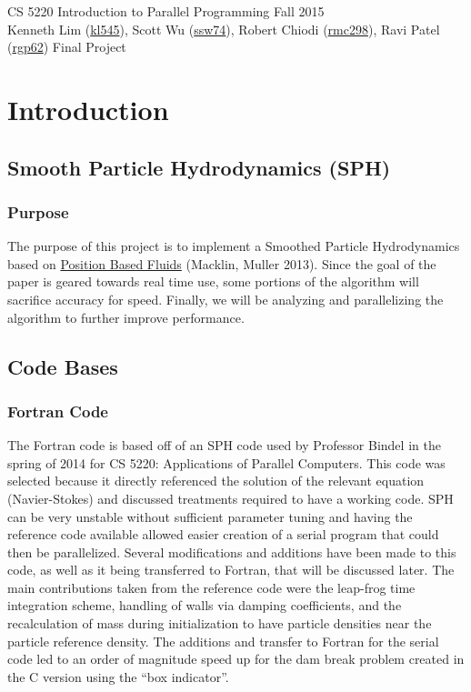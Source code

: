 \documentclass{scrartcl}
\begin{document}
   
    CS 5220 Introduction to Parallel Programming \hfill Fall 2015 \\
    Kenneth Lim (\href{mailto:kl545@cornell.edu}{kl545}), Scott Wu (\href{mailto:ssw74@cornell.edu}{ssw74}), Robert Chiodi (\href{mailto:rmc298@cornell.edu}{rmc298}), Ravi Patel (\href{mailto:rgp62@cornell.edu}{rgp62})  \hfill Final Project \hspace{-3ex}



    \section{Introduction}

    \subsection{Smooth Particle Hydrodynamics (SPH)}

    \subsubsection{Purpose}
    The purpose of this project is to implement a Smoothed Particle Hydrodynamics based on \href{http://mmacklin.com/pbf\_sig\_preprint.pdf}{Position Based Fluids} (Macklin, Muller 2013). Since the goal of the paper is geared towards real time use, some portions of the algorithm will sacrifice accuracy for speed. Finally, we will be analyzing and parallelizing the algorithm to further improve performance.
        
    \subsection{Code Bases}
    
    \subsubsection{Fortran Code}
    The Fortran code is based off of an SPH code used by Professor Bindel in the spring of 2014 for CS 5220: Applications of Parallel Computers. This code was selected because it directly referenced the solution of the relevant equation (Navier-Stokes) and discussed treatments required to have a working code. SPH can be very unstable without sufficient parameter tuning and having the reference code available allowed easier creation of a serial program that could then be parallelized. Several modifications and additions have been made to this code, as well as it being transferred to Fortran, that will be discussed later. The main contributions taken from the reference code were the leap-frog time integration scheme, handling of walls via damping coefficients, and the recalculation of mass during initialization to have particle densities near the particle reference density. The additions and transfer to Fortran for the serial code led to an order of magnitude speed up for the dam break problem created in the C version using the ``box indicator''. 
    
\end{document}
